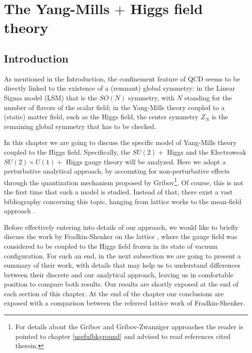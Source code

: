 

\chapter{The Yang-Mills $+$ Higgs field theory}
\label{The Yang-Mills $+$ Higgs field theory}





\section{Introduction}
\label{phasediag}


As mentioned in the Introduction, the confinement feature of QCD seems to be directly linked
to the existence of a (remnant) global symmetry: in the Linear Sigma model (LSM) that is the
$SO(N)$ symmetry, with $N$ standing for the number of flavors of the scalar field; in the
Yang-Mills theory coupled to a (static) matter field, such as the Higgs field, the center
symmetry $Z_{N}$ is the remaining global symmetry that has to be checked.

In this chapter we are going to discuss the specific model of Yang-Mills theory coupled to the
Higgs field. Specifically, the $SU(2)+$ Higgs and the Electroweak $SU(2)\times U(1)+$ Higgs
gauge theory will be analyzed. Here we adopt a perturbative analytical approach, by accounting
for non-perturbative effects through the quantization mechanism proposed by
Gribov\footnote{For details about the Gribov and Gribov-Zwanziger approaches the reader is
pointed to chapter \ref{usefulbkground} and advised to read references cited therein.}. Of
course, this is not the first time that such a model is studied. Instead of that, there
exist a vast bibliography concerning this topic, hanging from lattice works
\cite{Fradkin:1978dv,Lang:1981qg,Langguth:1985dr,Azcoiti:1987ua,Caudy:2007sf,Bonati:2009pf,Maas:2010nc,Maas:2012zf,Greensite:2011zz}
to the mean-field approach \cite{Horowitz:1983sr,Damgaard:1985nb,Baier:1986sa}.

Before effectively entering into details of our approach, we would like to briefly discuss the
work by Fradkin-Shenker on the lattice \cite{Fradkin:1978dv}, where the gauge field was
considered to be coupled to the Higgs field frozen in its state of vacuum configuration. For
such an end, in the next subsection we are going to present a summary of their work, with
details that may help us to understand differences between their discrete and our analytical
approach, leaving us in comfortable position to compare both results. Our results are shortly
exposed at the end of each section of this chapter. At the end of the chapter our conclusions
are exposed with a comparison between the referred lattice work of Fradkin-Shenker.







